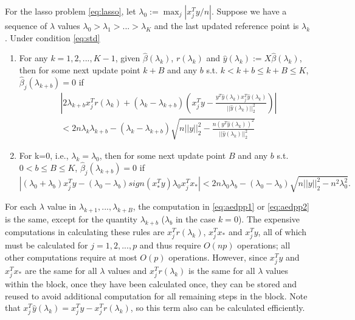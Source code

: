 \begin{theorem}
    For the lasso problem \eqref{eq:lasso}, let $\lambda_0:=\max_j|x_j^Ty/n|$. Suppose we have a sequence of $\lambda$ values $\lambda_0>\lambda_1>...>\lambda_K$ and the last updated reference point is $\lambda_k$. Under condition \eqref{eq:std}
    \begin{enumerate}
        \item For any $k=1,2,...,K-1$, given $\hat{\beta}(\lambda_k)$, $r(\lambda_k)$ and $\hat{y}(\lambda_k):=X\hat{\beta}(\lambda_k)$, then for some next update point $k+B$ and any $b$ s.t. $k<k+b\leq k+B\leq K$, $\hat{\beta}_j(\lambda_{k+b})=0$ if
        \begin{equation}
            \label{eq:aedpp1}
            \begin{split}
                &\left|2\lambda_{k+b}x_j^Tr(\lambda_k)+(\lambda_k-\lambda_{k+b})\left( x_j^Ty-\frac{y^T\hat{y}(\lambda_k)x_j^T\hat{y}(\lambda_k)}{||\hat{y}(\lambda_k)||_2^2}\right)\right|\\&<2n\lambda_k\lambda_{k+b}-(\lambda_k-\lambda_{k+b})\sqrt{n||y||_2^2-\frac{n(y^T\hat{y}(\lambda_k))^2}{||\hat{y}(\lambda_k)||_2^2}}
            \end{split}
        \end{equation}
        \item For k=0, i.e., $\lambda_k=\lambda_0$, then for some next update point $B$ and any $b$ s.t. $0<b\leq B\leq K$, $\hat{\beta}_j(\lambda_{k+b})=0$ if
        \begin{equation}
            \label{eq:aedpp2}
            |(\lambda_0+\lambda_b)x_j^Ty-(\lambda_0-\lambda_b)sign(x_*^Ty)\lambda_0x_j^Tx_*|<2n\lambda_0\lambda_b-(\lambda_0-\lambda_b)\sqrt{n||y||_2^2-n^2\lambda_0^2}.
        \end{equation}
    \end{enumerate}
\end{theorem}

For each $\lambda$ value in $\lambda_{k+1},...,\lambda_{k+B}$, the computation in \eqref{eq:aedpp1} or \eqref{eq:aedpp2} is the same, except for the quantity $\lambda_{k+b}$ ($\lambda_b$ in the case $k=0$). The expensive computations in calculating these rules are $x_j^Tr(\lambda_k)$, $x_j^Tx_*$ and $x_j^Ty$, all of which must be calculated for $j=1,2,...,p$ and thus require $O(np)$ operations; all other computations require at most $O(p)$ operations. However, since $x_j^Ty$ and $x_j^Tx_*$ are the same for all $\lambda$ values and $x_j^Tr(\lambda_k)$ is the same for all $\lambda$ values within the block, once they have been calculated once, they can be stored and reused to avoid additional computation for all remaining steps in the block.  Note that $x_j^T\hat{y}(\lambda_k)=x_j^Ty-x_j^Tr(\lambda_k)$, so this term also can be calculated efficiently.

